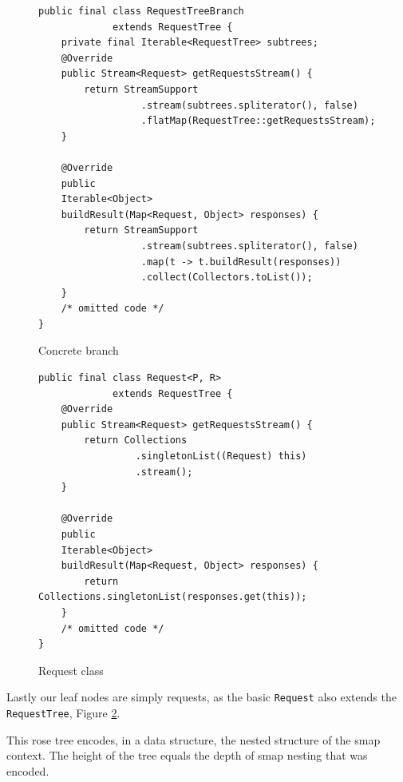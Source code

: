 \begin{figure}

\begin{verbatim}
public final class RequestTreeBranch
             extends RequestTree {
    private final Iterable<RequestTree> subtrees;
    @Override
    public Stream<Request> getRequestsStream() {
        return StreamSupport
                  .stream(subtrees.spliterator(), false)
                  .flatMap(RequestTree::getRequestsStream);
    }

    @Override
    public
    Iterable<Object>
    buildResult(Map<Request, Object> responses) {
        return StreamSupport
                  .stream(subtrees.spliterator(), false)
                  .map(t -> t.buildResult(responses))
                  .collect(Collectors.toList());
    }
    /* omitted code */
}
\end{verbatim}
\caption{Concrete branch}
\label{figure:tree-impl-branch}

\end{figure}
\begin{figure}

\begin{verbatim}
public final class Request<P, R>
             extends RequestTree {
    @Override
    public Stream<Request> getRequestsStream() {
        return Collections
                 .singletonList((Request) this)
                 .stream();
    }

    @Override
    public
    Iterable<Object>
    buildResult(Map<Request, Object> responses) {
        return Collections.singletonList(responses.get(this));
    }
    /* omitted code */
}
\end{verbatim}

\caption{Request class}
\label{figure:tree-impl-request-class}
\end{figure}

Lastly our leaf nodes are simply requests, as the basic \texttt{Request} also extends the \texttt{RequestTree}, Figure \ref{figure:tree-impl-request-class}.

This rose tree encodes, in a data structure, the nested structure of the smap context.
The height of the tree equals the depth of smap nesting that was encoded.

